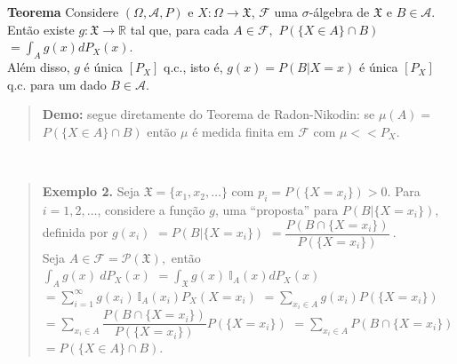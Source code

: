 \documentclass[
]{book}
\begin{document}
\(~\)

\(~\)

\textbf{Teorema} Considere \((\Omega,\mathcal{A},P)\) e \(X:\Omega \longrightarrow \mathfrak{X}\), \(\mathcal{F}\) uma \(\sigma\)-álgebra de \(\mathfrak{X}\) e \(B \in \mathcal{A}.\) Então existe \(g:\mathfrak{X} \longrightarrow \mathbb{R}\) tal que, para cada \(A \in \mathcal{F},\)
\(P(\{X\in A\}\cap B)\) \(=\displaystyle\int_Ag(x)dP_X(x).\)\\
Além disso, \(g\) é única \([P_X]\) q.c., isto é, \(g(x)=P(B|X=x)\) é única \([P_X]\) q.c. para um dado \(B\in\mathcal{A}\).

\begin{quote}
\textbf{Demo:} segue diretamente do Teorema de Radon-Nikodin: se \(\mu(A)=\) \(P(\{X\in A\}\cap B)\) então \(\mu\) é medida finita em \(\mathcal{F}\) com \(\mu << P_X\).
\end{quote}

\(~\)

\begin{quote}
\textbf{Exemplo 2.} Seja \(\mathfrak{X}=\{x_1,x_2,\ldots\}\) com \(p_i=P(\{X=x_i\})>0.\) Para \(i=1,2,\ldots\), considere a função \(g\), uma ``proposta'' para \(P\left(B|\{X=x_i\}\right)\), definida por \(g(x_i)\) \(=P\left(B|\{X=x_i\}\right)\) \(=\dfrac{P\left(B\cap \{X=x_i\}\right)}{P\left(\{X=x_i\}\right)}~.\)\\
Seja \(A \in \mathcal{F}=\mathcal{P}(\mathfrak{X}),\) então\\
\(\displaystyle\int_A g(x)~dP_X(x)\)
\(=\displaystyle\int_{\mathfrak{X}}g(x)~\mathbb{I}_A(x)dP_X(x)\)
\(=\displaystyle\sum_{i=1}^\infty g(x_i)~\mathbb{I}_A(x_i)P_X(X=x_i)\)
\(=\displaystyle\sum_{x_i \in A}g(x_i)P\left(\{X=x_i\}\right)\)
\(=\displaystyle\sum_{x_i \in A}\dfrac{P\left(B\cap \{X=x_i\}\right)}{P\left(\{X=x_i\}\right)}P\left(\{X=x_i\}\right)\)
\(=\displaystyle\sum_{x_i \in A}P\left(B \cap \{X=x_i\}\right)\)
\(=P\left(\{X\in A\}\cap B\right).\)
\end{quote}

\(~\)
\end{document}
